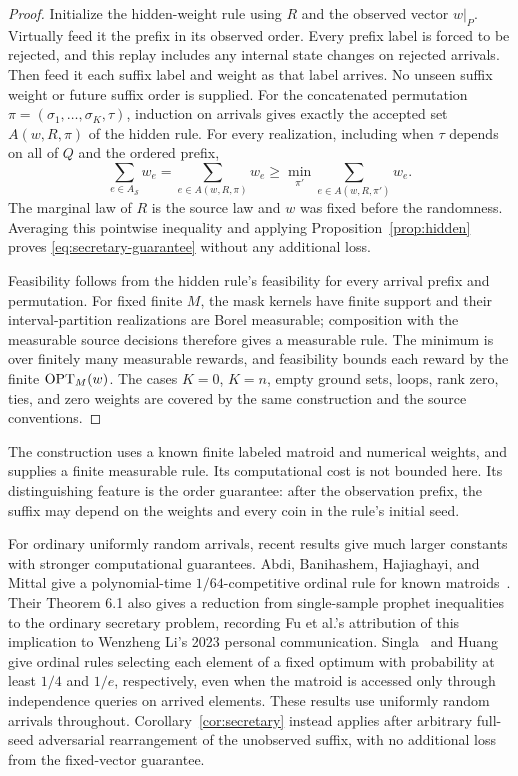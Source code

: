 \begin{proof}
Initialize the hidden-weight rule using $R$ and the observed vector
$w|_P$. Virtually feed it the prefix in its observed order. Every prefix
label is forced to be rejected, and this replay includes any internal state
changes on rejected arrivals. Then feed it each suffix label and weight
as that label arrives. No unseen suffix weight or future suffix order is
supplied. For the concatenated permutation
$\pi=(\sigma_1,\ldots,\sigma_K,\tau)$, induction on arrivals gives exactly
the accepted set $A(w,R,\pi)$ of the hidden rule. For every realization,
including when $\tau$ depends on all of $Q$ and the ordered prefix,
\[
 \sum_{e\in A_{\mathcal S}}w_e
 =\sum_{e\in A(w,R,\pi)}w_e
 \ge \min_{\pi'}\sum_{e\in A(w,R,\pi')}w_e.
\]
The marginal law of $R$ is the source law and $w$ was fixed before the
randomness. Averaging this pointwise inequality and applying
Proposition~\ref{prop:hidden} proves \eqref{eq:secretary-guarantee}
without any additional loss.

Feasibility follows from the hidden rule's feasibility for every arrival
prefix and permutation. For fixed finite $M$, the mask kernels have finite
support and their interval-partition realizations are Borel measurable;
composition with the measurable source decisions therefore gives a
measurable rule. The minimum is over finitely many measurable rewards,
and feasibility bounds each reward by the finite $\operatorname{OPT}_M(w)$. The cases
$K=0$, $K=n$, empty ground sets, loops, rank zero, ties, and zero weights
are covered by the same construction and the source conventions.
\end{proof}

The construction uses a known finite labeled matroid and numerical
weights, and supplies a finite measurable rule. Its computational cost
is not bounded here. Its distinguishing feature is the order guarantee:
after the observation prefix, the suffix may depend on the weights and
every coin in the rule's initial seed.

For ordinary uniformly random arrivals, recent results give much larger
constants with stronger computational guarantees. Abdi, Banihashem,
Hajiaghayi, and Mittal give a polynomial-time $1/64$-competitive ordinal
rule for known matroids~\cite[Corollary 1.4]{ABHM26}. Their Theorem 6.1
also gives a reduction from single-sample prophet inequalities to the
ordinary secretary problem, recording Fu et al.'s attribution of this
implication to Wenzheng Li's 2023 personal communication.
Singla~\cite[Theorem 3.1]{Singla26} and
Huang~\cite[Theorem 1]{Huang26} give ordinal rules selecting each element
of a fixed optimum with probability at least $1/4$ and $1/e$,
respectively, even when the matroid is accessed only through independence
queries on arrived elements. These results use uniformly random arrivals
throughout. Corollary~\ref{cor:secretary} instead applies after arbitrary
full-seed adversarial rearrangement of the unobserved suffix, with no
additional loss from the fixed-vector guarantee.
